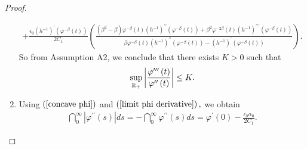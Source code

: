 \documentclass[11pt,reqno]{amsart}
\theoremstyle{plain}
\numberwithin{equation}{section}
\numberwithin{equation}{section}
\begin{document}
\begin{proof}
\begin{enumerate}
\begin{equation*}
\begin{array}{l}
+\frac{\epsilon _{0}\left( h^{-1}\right) ^{\prime }\left( \varphi ^{-\beta
}\left( t\right) \right) }{2C_{1}}\left( \frac{\left( \beta ^{2}-\beta
\right) \varphi ^{-\beta }\left( t\right) \left( h^{-1}\right) ^{\prime
\prime }\left( \varphi ^{-\beta }\left( t\right) \right) +\beta ^{2}\varphi
^{-2\beta }\left( t\right) \left( h^{-1}\right) ^{\prime \prime \prime
}\left( \varphi ^{-\beta }\left( t\right) \right) }{\beta \varphi ^{-\beta
}\left( t\right) \left( h^{-1}\right) ^{\prime \prime }\left( \varphi
^{-\beta }\left( t\right) \right) -\left( h^{-1}\right) ^{\prime }\left(
\varphi ^{-\beta }\left( t\right) \right) }\right) .%
\end{array}%
\end{equation*}%
So from Assumption A2, we conclude that there exists $K>0$ such that%
\begin{equation*}
\underset{%
\mathbb{R}
_{+}}{\sup }\left\vert \frac{\varphi ^{\prime \prime \prime }\left( t\right) 
}{\varphi ^{\prime \prime }\left( t\right) }\right\vert \leq K.
\end{equation*}

\item Using $\left( \ref{concave phi}\right) $ and $\left( \ref{limit phi
derivative}\right) ,$ we obtain%
\begin{equation*}
\begin{array}{c}
\dint_{0}^{\infty }\left\vert \varphi ^{\prime \prime }\left( s\right)
\right\vert ds=-\dint_{0}^{\infty }\varphi ^{\prime \prime }\left( s\right)
ds=\varphi ^{\prime }\left( 0\right) -\frac{\epsilon _{0}\alpha _{0}}{2C_{1}}%
.%
\end{array}%
\end{equation*}


\end{enumerate}
\end{proof}
\end{document}
